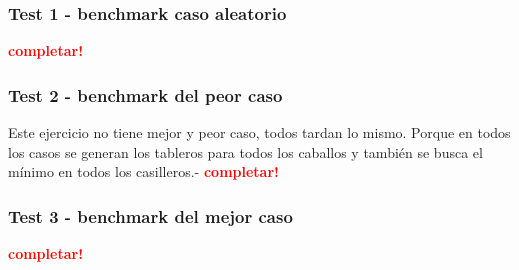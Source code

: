 \subsubsection{Test 1 - benchmark caso aleatorio}

\textcolor{red}{\textbf{completar!}}


\newpage
\subsubsection{Test 2 - benchmark del peor caso}

Este ejercicio no tiene mejor y peor caso, todos tardan lo mismo.
Porque en todos los casos se generan los tableros para todos los caballos
y también se busca el mínimo en todos los casilleros.-
\textcolor{red}{\textbf{completar!}}


\newpage
\subsubsection{Test 3 - benchmark del mejor caso}

\textcolor{red}{\textbf{completar!}}
